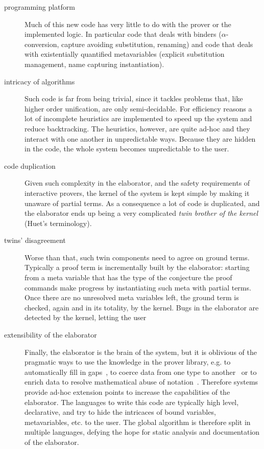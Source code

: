 \documentclass{easychair}
\begin{document}
\begin{description}
\item[programming platform]
Much of this new code has very little to do with the prover or the implemented
logic. In particular code that deals with binders ($\alpha$-conversion,
capture avoiding substitution, renaming) and code that deals with existentially
quantified metavariables (explicit substitution management, name capturing
instantiation).
\item[intricacy of algorithms]
Such code is far from being trivial, since it tackles problems that, like
higher order unification, are only semi-decidable. For efficiency reasons a lot
of incomplete heuristics are implemented to speed up the system and reduce
backtracking. The heuristics, however, are quite ad-hoc and they interact with
one another in unpredictable ways. Because they are hidden in the code, the
whole system becomes unpredictable to the user.
\item[code duplication]
Given such complexity in the elaborator, and the safety requirements of interactive provers, the kernel of the system is kept simple by making it unaware of partial terms.  As a consequence a lot of code is duplicated, and
the elaborator ends up being a very complicated \emph{twin brother of the
kernel} (Huet's terminology).
\item[twins' disagreement]
Worse than that, such twin components need to agree on ground terms.
Typically a proof term is incrementally built by the elaborator:
starting from a meta variable that has the type of
the conjecture the proof commands make progress by instantiating such
meta with partial terms.  Once there are no unresolved meta variables left,
the ground term is checked, again and in its totality, by the kernel.
Bugs in the elaborator are detected by the kernel, letting the user 
\item[extensibility of the elaborator]
Finally, the elaborator is the brain of the system, but it is oblivious of the
pragmatic ways to use the knowledge in the prover library, e.g.  to
automatically fill in gaps~\cite{mathcomponents}, to coerce data from one type
to another~\cite{coercivesubtyping} or to enrich data to resolve mathematical
abuse of notation~\cite{nonuniformunificationhints}. Therefore systems provide
ad-hoc extension points to increase the capabilities of the elaborator.  The
languages to write this code are typically high level, declarative, and
try to hide the intricaces of bound variables, metavariables, etc. to the user.
The global algorithm is therefore split in multiple languages, defying the hope
for static analysis and documentation of the elaborator.
\end{description}
\end{document}
